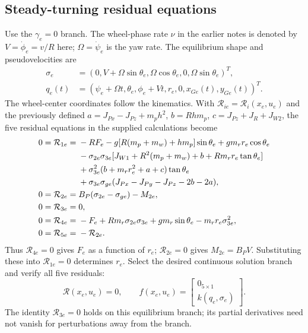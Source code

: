\documentclass[10pt]{article}
\numberwithin{equation}{section}
\begin{document}
\subsection{Steady-turning residual equations}
Use the $\gamma_e=0$ branch. The wheel-phase rate $\nu$ in the earlier
notes is denoted by $V=\dot\phi_e=v/R$ here; $\Omega=\dot\psi_e$ is the yaw rate.
The equilibrium shape and pseudovelocities are
\begin{equation}
\begin{aligned}
\sigma_e&=(0,V+\Omega\sin\theta_e,\Omega\cos\theta_e,0,\Omega\sin\theta_e)^T,\\
q_e(t)&=(\psi_e+\Omega t,\theta_e,\phi_e+Vt,r_e,0,x_{Ge}(t),y_{Ge}(t))^T.
\end{aligned}
\end{equation}
The wheel-center coordinates follow the kinematics. With
$\mathcal R_{ie}=\mathcal R_i(x_e,u_e)$ and the previously defined
$a=J_{Px}-J_{Pz}+m_ph^2$, $b=Rhm_p$, $c=J_{Pz}+J_R+J_{W2}$,
the five residual equations in the supplied calculations become
\begin{align}
0=\mathcal R_{1e}={}&-RF_e-g[R(m_p+m_w)+hm_p]\sin\theta_e
+gm_r r_e\cos\theta_e\notag\\
&-\sigma_{2e}\sigma_{3e}
[J_{W1}+R^2(m_p+m_w)+b+Rm_r r_e\tan\theta_e]\notag\\
&+\sigma_{3e}^2(b+m_r r_e^2+a+c)\tan\theta_e\notag\\
&+\sigma_{3e}\sigma_{ge}(J_{Px}-J_{Py}-J_{Pz}-2b-2a),\\
0=\mathcal R_{2e}={}&B_P(\sigma_{2e}-\sigma_{ge})-M_{2e},\\
0=\mathcal R_{3e}={}&0,\\
0=\mathcal R_{4e}={}&-F_e+Rm_r\sigma_{2e}\sigma_{3e}
+gm_r\sin\theta_e-m_r r_e\sigma_{3e}^2,\\
0=\mathcal R_{5e}={}&-\mathcal R_{2e}.
\end{align}
Thus $\mathcal R_{4e}=0$ gives $F_e$ as a function of $r_e$;
$\mathcal R_{2e}=0$ gives $M_{2e}=B_PV$. Substituting these into
$\mathcal R_{1e}=0$ determines $r_e$. Select the desired continuous solution
branch and verify all five residuals:
\begin{equation}
\boxed{\mathcal R(x_e,u_e)=0,\qquad
f(x_e,u_e)=\begin{bmatrix}0_{5\times1}\\k(q_e,\sigma_e)\end{bmatrix}.}
\end{equation}
The identity $\mathcal R_{3e}=0$ holds on this equilibrium branch;
its partial derivatives need not vanish for perturbations away from the branch.
\end{document}
